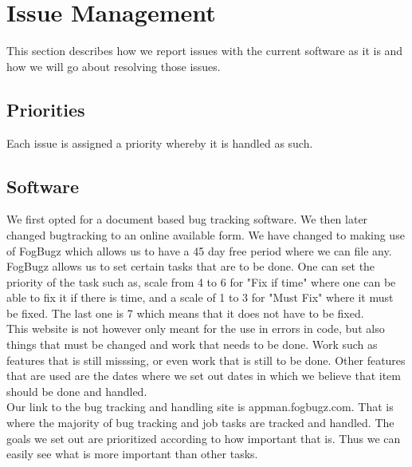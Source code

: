\documentclass[a4paper,12pt,final]{article}
\begin{document}
\newpage
\section{Issue Management}
This section describes how we report issues with the current software as it is and how we will go about resolving those issues. 
\subsection{Priorities}
Each issue is assigned a priority whereby it is handled as such. 
\subsection{Software}
We first opted for a document based bug tracking software. We then later changed bugtracking to an online available form. We have changed to making use of FogBugz which allows us to have a 45 day free period where we can file any.
\\
FogBugz allows us to set certain tasks that are to be done. One can set the priority of the task such as, scale from 4 to 6 for "Fix if time" where one can be able to fix it if there is time, and a scale of 1 to 3 for "Must Fix" where it must be fixed. The last one is 7 which means that it does not have to be fixed.
\\
This website is not however only meant for the use in errors in code, but also things that must be changed and work that needs to be done. Work such as features that is still misssing, or even work that is still to be done. Other features that are used are the dates where we set out dates in which we believe that item should be done and handled.
\\
Our link to the bug tracking and handling site is appman.fogbugz.com. That is where the majority of bug tracking and job tasks are tracked and handled. The goals we set out are prioritized according to how important that is. Thus we can easily see what is more important than other tasks. 

\newpage
\end{document}
